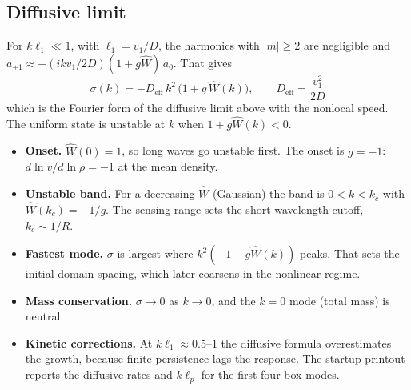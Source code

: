 \documentclass[11pt]{article}
\newcommand{\Wh}{\hat W}
\begin{document}
\subsection{Diffusive limit}
For $k\ell_1\ll1$, with $\ell_1 = v_1/D$, the harmonics with $|m|\ge2$ are
negligible and $a_{\pm1}\approx-(ikv_1/2D)(1+g\Wh)\,a_0$. That gives
\begin{equation}
  \boxed{\ \sigma(k) = -D_{\mathrm{eff}}\,k^2\,\bigl(1+g\,\Wh(k)\bigr),
  \qquad D_{\mathrm{eff}} = \frac{v_1^2}{2D}\ }
\end{equation}
which is the Fourier form of the diffusive limit above with the nonlocal
speed. The uniform state is unstable at $k$ when $1+g\Wh(k)<0$.
\begin{itemize}
  \item \textbf{Onset.} $\Wh(0)=1$, so long waves go unstable first. The
        onset is $g=-1$: $d\ln v/d\ln\rho=-1$ at the mean density.
  \item \textbf{Unstable band.} For a decreasing $\Wh$ (Gaussian) the band is
        $0<k<k_c$ with $\Wh(k_c)=-1/g$. The sensing range sets the
        short-wavelength cutoff, $k_c\sim1/R$.
  \item \textbf{Fastest mode.} $\sigma$ is largest where
        $k^2(-1-g\Wh(k))$ peaks. That sets the initial domain spacing, which
        later coarsens in the nonlinear regime.
  \item \textbf{Mass conservation.} $\sigma\to0$ as $k\to0$, and the $k=0$
        mode (total mass) is neutral.
  \item \textbf{Kinetic corrections.} At $k\ell_1\approx0.5$--$1$ the
        diffusive formula overestimates the growth, because finite
        persistence lags the response. The startup printout reports the
        diffusive rates and $k\ell_p$ for the first four box modes.
\end{itemize}
\end{document}

